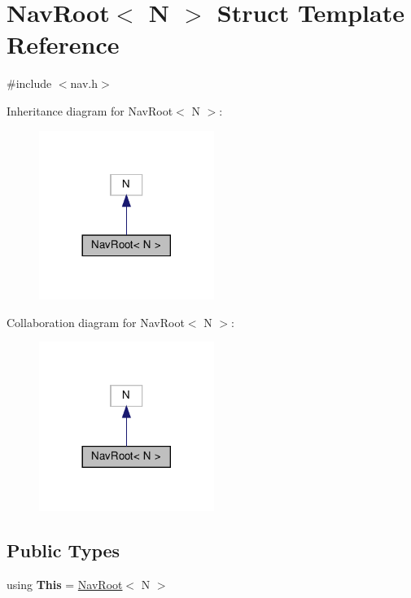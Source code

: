\hypertarget{structNavRoot}{}\section{Nav\+Root$<$ N $>$ Struct Template Reference}
\label{structNavRoot}


{\ttfamily \#include $<$nav.\+h$>$}



Inheritance diagram for Nav\+Root$<$ N $>$\+:\nopagebreak
\begin{figure}[H]
\begin{center}
\leavevmode
\includegraphics[width=161pt]{structNavRoot__inherit__graph}
\end{center}
\end{figure}


Collaboration diagram for Nav\+Root$<$ N $>$\+:\nopagebreak
\begin{figure}[H]
\begin{center}
\leavevmode
\includegraphics[width=161pt]{structNavRoot__coll__graph}
\end{center}
\end{figure}
\subsection*{Public Types}
\begin{DoxyCompactItemize}
\item 
\mbox{\label{structNavRoot_a7a80cda58fc1952053328b4c52451f50}} 
using {\bfseries This} = \hyperlink{structNavRoot}{Nav\+Root}$<$ N $>$
\end{DoxyCompactItemize}
